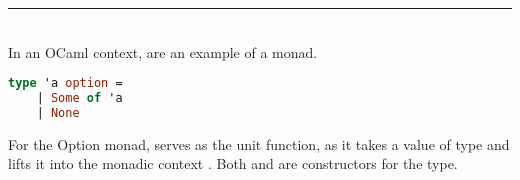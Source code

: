 \begin{Def}[Monads]
    \noindent
    \rule{\textwidth}{0.4pt}\\

    \noindent
    In an OCaml context,  are an example of a monad.
    \begin{lstlisting}[language=OCaml, caption={Option Monad in OCaml}, numbers=none]
    type 'a option = 
    | Some of 'a 
    | None    
    \end{lstlisting}
    \noindent
    For the Option monad,  serves as the unit function, as it takes a value of type  and lifts it into the monadic context .
    Both  and  are constructors for the  type.
    \end{Def}
    
    \newpage 
    \vspace{2em}

